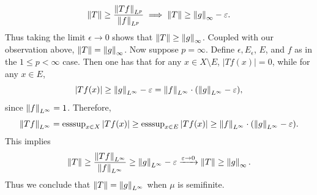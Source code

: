 \documentclass{article}
\begin{document}
	\begin{equation*}
		\left\Vert T \right\Vert \geq \frac{\left\Vert Tf \right\Vert_{L^{p}}}{\left\Vert f \right\Vert_{L^{p}}} \implies \left\Vert T \right\Vert \geq \left\Vert g \right\Vert_{\infty} - \varepsilon. 
	\end{equation*}
	Thus taking the limit $\epsilon \to 0$ shows that $\left\Vert T \right\Vert \geq \left\Vert g \right\Vert_{\infty}$. Coupled with our observation above, $\left\Vert T \right\Vert = \left\Vert g \right\Vert_{\infty}$. Now suppose $p = \infty$. Define $\epsilon, E_{\epsilon}$, $E$, and $f$ as in the $1 \leq p < \infty$ case. Then one has that for any $x \in X \setminus E$, $|Tf(x)| = 0$, while for any $x \in E$, 
	\begin{equation*}
		|Tf(x)| \geq \left\Vert g \right\Vert_{L^\infty} - \varepsilon = \left\Vert f \right\Vert_{L^{\infty}} \cdot (\left\Vert g \right\Vert_{L^{\infty}} - \varepsilon), 
	\end{equation*}
	since $\left\Vert f \right\Vert_{L^{\infty}} = 1$. Therefore, 
	\begin{equation*}
		\left\Vert Tf \right\Vert_{L^{\infty}} = \operatorname{ess sup}_{x \in X}|Tf(x)| \geq \operatorname{ess sup}_{x \in E}|Tf(x)| \geq \left\Vert f \right\Vert_{L^{\infty}} \cdot (\left\Vert g \right\Vert_{L^\infty} - \varepsilon). 
	\end{equation*}
	This implies 
	\begin{equation*}
		\left\Vert T \right\Vert \geq \frac{\left\Vert Tf \right\Vert_{L^{\infty}}}{\left\Vert f \right\Vert_{L^{\infty}}} \geq \left\Vert g \right\Vert_{L^{\infty}} - \varepsilon \xrightarrow{\varepsilon \to 0} \left\Vert T \right\Vert \geq \left\Vert g \right\Vert_{\infty}. 
	\end{equation*}
	Thus we conclude that $\left\Vert T \right\Vert = \left\Vert g \right\Vert_{L^{\infty}}$ when $\mu$ is semifinite. 
	
\end{document}
